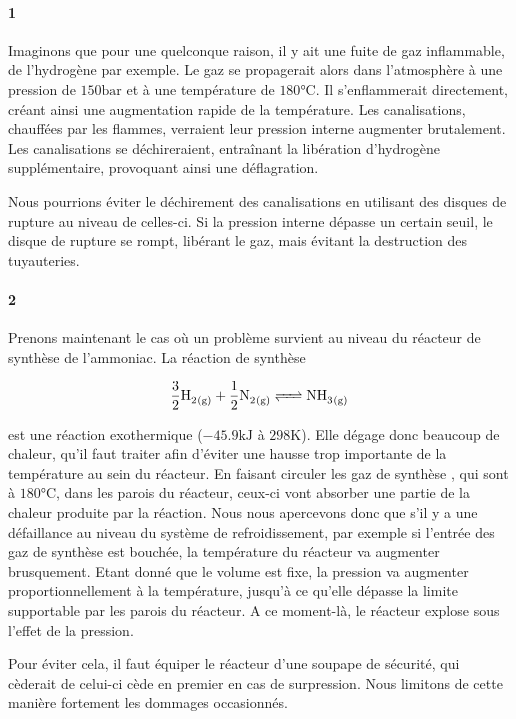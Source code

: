 \documentclass[a4paper,oneside,12pt]{article}
\begin{document}
\paragraph{1} Imaginons que pour une quelconque raison, il y ait une fuite de gaz inflammable, 
de l'hydrogène par exemple. Le gaz se propagerait alors dans l'atmosphère à 
une pression de $150\si{\bar}$ et à une température de $180\si{\celsius}$. 
Il s'enflammerait directement, créant ainsi une augmentation rapide de la température. 
Les canalisations, chauffées par les flammes, verraient leur pression interne augmenter 
brutalement. Les canalisations se déchireraient, entraînant la libération d'hydrogène 
supplémentaire, provoquant ainsi une déflagration.

Nous pourrions éviter le déchirement des canalisations en utilisant des disques de rupture 
au niveau de celles-ci. Si la pression interne dépasse un certain seuil, le disque de rupture 
se rompt, libérant le gaz, mais évitant la destruction des tuyauteries.

\paragraph{2} Prenons maintenant le cas où un problème survient au niveau du réacteur 
de synthèse de l'ammoniac. La réaction de synthèse

\begin{equation}
	\ce{\frac{3}{2} H2_{(g)} + \frac{1}{2} N2_{(g)} <=> NH3_{(g)}}
	\label{eq:synthesis}
\end{equation}

est une réaction exothermique ($-45.9\si{\kilo\joule}$ à $298\si{\kelvin}$). 
Elle dégage donc beaucoup de chaleur, qu'il faut traiter afin d'éviter 
une hausse trop importante de la température au sein du réacteur. 
En faisant circuler les gaz de synthèse ,  
qui sont à $180\si{\celsius}$, dans les parois du réacteur, 
ceux-ci vont absorber une partie de la chaleur produite par la réaction. 
Nous nous apercevons donc que s'il y a une défaillance au niveau du système 
de refroidissement, par exemple si l'entrée des gaz de synthèse est bouchée, 
la température du réacteur va augmenter brusquement. Etant donné que le volume est fixe, 
la pression va augmenter proportionnellement à la température, 
jusqu'à ce qu'elle dépasse la limite supportable par les parois du réacteur. 
A ce moment-là, le réacteur explose sous l'effet de la pression.

Pour éviter cela, il faut équiper le réacteur d'une soupape de sécurité, qui cèderait de celui-ci cède en premier en cas de surpression. 
Nous limitons de cette manière fortement les dommages occasionnés.
\end{document}
